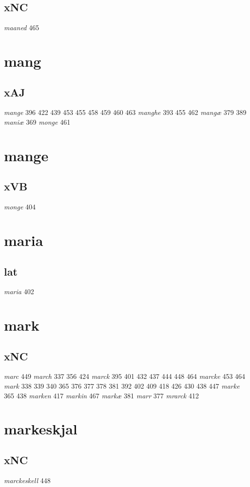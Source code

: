 \documentclass[a4paper,twocolumn]{article}
\begin{document}
\subsection{xNC}
\label{sec:org3e438d0}
\emph{maaned} 465 
\section{mang}
\label{sec:org056f469}
\subsection{xAJ}
\label{sec:org39dec6c}
\emph{mange} 396 422 439 453 455 458 459 460 463 \emph{manghe} 393 455 462 \emph{mangæ} 379 389 \emph{maniæ} 369 \emph{monge} 461 
\section{mange}
\label{sec:org3026695}
\subsection{xVB}
\label{sec:org4231a63}
\emph{monge} 404 
\section{maria}
\label{sec:org02cb365}
\subsection{lat}
\label{sec:org28f355c}
\emph{maria} 402 
\section{mark}
\label{sec:org386b11f}
\subsection{xNC}
\label{sec:org3782a0d}
\emph{marc} 449 \emph{march} 337 356 424 \emph{marck} 395 401 432 437 444 448 464 \emph{marcke} 453 464 \emph{mark} 338 339 340 365 376 377 378 381 392 402 409 418 426 430 438 447 \emph{marke} 365 438 \emph{marken} 417 \emph{markin} 467 \emph{markæ} 381 \emph{marr} 377 \emph{mrarck} 412 
\section{markeskjal}
\label{sec:org73a0bdf}
\subsection{xNC}
\label{sec:orgbf7f358}
\emph{marckeskell} 448 
\end{document}
